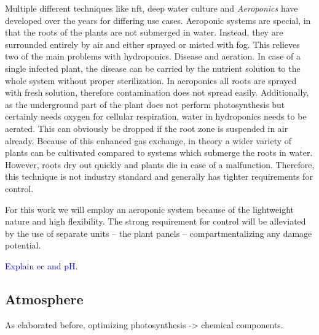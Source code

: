 Multiple different techniques like \ac{nft}, deep water culture and \textit{Aeroponics} have developed over the years for differing use cases.
Aeroponic systems are special, in that the roots of the plants are not submerged in water.
Instead, they are surrounded entirely by air and either sprayed or misted with fog.
This relieves two of the main problems with hydroponics.
Disease and aeration.
In case of a single infected plant, the disease can be carried by the nutrient solution to the whole system without proper sterilization.
In aeroponics all roots are sprayed with fresh solution, therefore contamination does not spread easily.
Additionally, as the underground part of the plant does not perform photosynthesis but certainly needs oxygen for cellular respiration, water in hydroponics needs to be aerated.
This can obviously be dropped if the root zone is suspended in air already.
Because of this enhanced gas exchange, in theory a wider variety of plants can be cultivated compared to systems which submerge the roots in water.
However, roots dry out quickly and plants die in case of a malfunction.
Therefore, this technique is not industry standard and generally has tighter requirements for control.

For this work we will employ an aeroponic system because of the lightweight nature and high flexibility.
The strong requirement for control will be alleviated by the use of separate units -- the plant panels -- compartmentalizing any damage potential.

\textcolor{Blue}{Explain \ac{ec} and pH.} 




\subsection{Atmosphere}
As elaborated before, optimizing photosynthesis -> chemical components.

